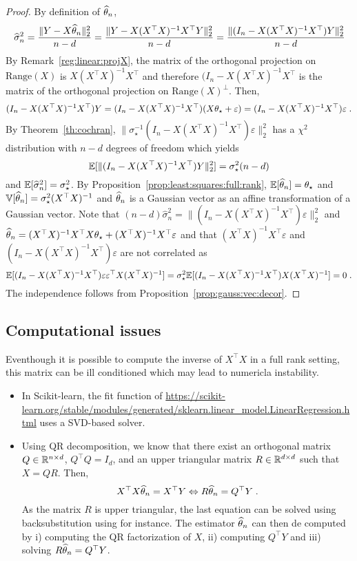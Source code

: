 \begin{proof}
By definition of $\widehat {\theta}_n$,
\[
\widehat \sigma^2_n =\frac{\|Y - X\widehat {\theta}_n \|_2^2}{n-d} = \frac{\|Y - X(X^\top X)^{-1}X^\top Y\|_2^2}{n-d} = \frac{\|(I_n - X(X^\top X)^{-1}X^\top )Y\|_2^2}{n-d}
\]
By Remark~\ref{reg:linear:projX}, the matrix of the orthogonal projection on $\mathrm{Range}(X)$ is $X(X^\top X)^{-1}X^\top$ and therefore $(I_n - X(X^\top X)^{-1}X^\top$ is the matrix  of the orthogonal projection on $\mathrm{Range}(X)^{\perp}$. Then,
\[
(I_n - X(X^\top X)^{-1}X^\top)Y = (I_n - X(X^\top X)^{-1}X^\top)(X\theta_\star + \varepsilon) = (I_n - X(X^\top X)^{-1}X^\top)\varepsilon\;.
\]
By Theorem~\ref{th:cochran}, $\|\sigma_\star^{-1}(I_n - X(X^\top X)^{-1}X^\top)\varepsilon\|_2^2$ has a $\chi^2$ distribution with $n-d$ degrees of freedom which yields
\[
\mathbb{E}[\|(I_n - X(X^\top X)^{-1}X^\top)Y\|_2^2] = \sigma_\star^2(n-d)
\]
and $\mathbb{E}[\widehat \sigma^2_n ] = \sigma_\star^2$. By Proposition~\ref{prop:least:squares:full:rank}, $\mathbb{E}[\widehat {\theta}_n] = \theta_\star$ and $\mathbb{V}[\widehat {\theta}_n] = \sigma_\star^2(X^\top X)^{-1}$ and $\widehat {\theta}_n$ is a Gaussian vector as an  affine transformation of a Gaussian vector. Note that $(n-d)\widehat \sigma^2_n = \|(I_n - X(X^\top X)^{-1}X^\top)\varepsilon\|_2^2$ and $\widehat {\theta}_n = (X^\top X)^{-1}X^\top X\theta_{\star} + (X^\top X)^{-1}X^\top\varepsilon$ and that $(X^\top X)^{-1}X^\top\varepsilon$ and $(I_n - X(X^\top X)^{-1}X^\top)\varepsilon$ are not correlated as 
\[
\mathbb{E}[(I_n - X(X^\top X)^{-1}X^\top)\varepsilon \varepsilon^\top X(X^\top X)^{-1}] = \sigma_\star^2\mathbb{E}[(I_n - X(X^\top X)^{-1}X^\top)X(X^\top X)^{-1}] = 0\;.
\]
The independence follows from Proposition~\ref{prop:gauss:vec:decor}.
\end{proof}

\subsection{Computational issues}
Eventhough it is possible to compute  the inverse of $X^\top X$ in a full rank setting, this matrix can be ill conditioned which may lead to numericla instability. 
\begin{itemize}
\item In Scikit-learn, the fit function of \url{https://scikit-learn.org/stable/modules/generated/sklearn.linear\_model.LinearRegression.html} uses a SVD-based solver.
\item Using QR decomposition, we know that there exist an orthogonal matrix $Q\in\mathbb{R}^{n\times d}$, $Q^\top Q = I_d$, and an upper triangular matrix $R\in\mathbb{R}^{d\times d}$ such that $X = QR$. Then,
$$
X^\top X \widehat{\theta}_n = X^\top Y \Leftrightarrow R\widehat {\theta}_n = Q^\top Y\;.
$$
As the matrix $R$ is upper triangular, the last equation can be solved using backsubstitution using for instance. The estimator $\widehat{\theta}_n$ can then de computed by i) computing the QR factorization of $X$, ii) computing $Q^\top Y$ and iii) solving $R\widehat {\theta}_n = Q^\top Y$.
\end{itemize}

